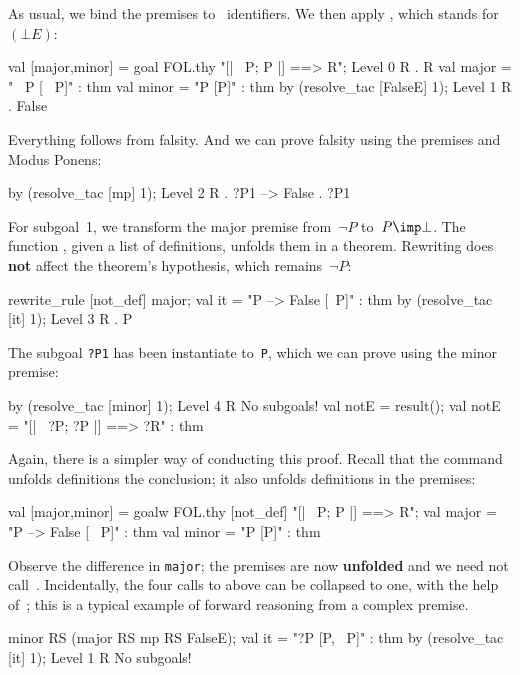 As usual, we bind the premises to \ML\ identifiers.  We then apply
, which stands for~$(\bot E)$:
\begin{ttbox}
val [major,minor] = goal FOL.thy "[| ~P;  P |] ==> R";
{\out Level 0}
{\out R}
{. R}
{\out val major = "~ P  [~ P]" : thm}
{\out val minor = "P  [P]" : thm}
\ttbreak
by (resolve_tac [FalseE] 1);
{\out Level 1}
{\out R}
{. False}
\end{ttbox}
Everything follows from falsity.  And we can prove falsity using the
premises and Modus Ponens:
\begin{ttbox}
by (resolve_tac [mp] 1);
{\out Level 2}
{\out R}
{. ?P1 --> False}
{. ?P1}
\end{ttbox}
For subgoal~1, we transform the major premise from~$\neg P$
to~${P\imp\bot}$.  The function , given a list of
definitions, unfolds them in a theorem.  Rewriting does {\bf not}
affect the theorem's hypothesis, which remains~$\neg P$:
\begin{ttbox}
rewrite_rule [not_def] major;
{\out val it = "P --> False  [~P]" : thm}
by (resolve_tac [it] 1);
{\out Level 3}
{\out R}
{. P}
\end{ttbox}
The subgoal {\tt?P1} has been instantiate to~{\tt P}, which we can prove
using the minor premise:
\begin{ttbox}
by (resolve_tac [minor] 1);
{\out Level 4}
{\out R}
{\out No subgoals!}
val notE = result();
{\out val notE = "[| ~?P; ?P |] ==> ?R" : thm}
\end{ttbox}

\medskip
Again, there is a simpler way of conducting this proof.  Recall that
the  command unfolds definitions the conclusion; it also
unfolds definitions in the premises:
\begin{ttbox}
val [major,minor] = goalw FOL.thy [not_def]
    "[| ~P;  P |] ==> R";
{\out val major = "P --> False  [~ P]" : thm}
{\out val minor = "P  [P]" : thm}
\end{ttbox}
Observe the difference in {\tt major}; the premises are now {\bf unfolded}
and we need not call~.  Incidentally, the four calls
to  above can be collapsed to one, with the help
of~; this is a typical example of forward reasoning from a
complex premise.
\begin{ttbox}
minor RS (major RS mp RS FalseE);
{\out val it = "?P  [P, ~P]" : thm}
by (resolve_tac [it] 1);
{\out Level 1}
{\out R}
{\out No subgoals!}
\end{ttbox}

